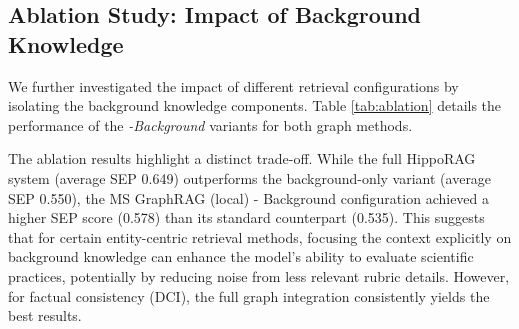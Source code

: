 \documentclass{edm_article}
\begin{document}
\subsection{Ablation Study: Impact of Background Knowledge}
We further investigated the impact of different retrieval configurations by isolating the background knowledge components. Table \ref{tab:ablation} details the performance of the \textit{-Background} variants for both graph methods.

\begin{table}[h]
\centering
\caption{Ablation Study on Background Knowledge Configuration}
\label{tab:ablation}
\end{table}

The ablation results highlight a distinct trade-off. While the full HippoRAG system (average SEP 0.649) outperforms the background-only variant (average SEP 0.550), the MS GraphRAG (local) - Background configuration achieved a higher SEP score (0.578) than its standard counterpart (0.535). This suggests that for certain entity-centric retrieval methods, focusing the context explicitly on background knowledge can enhance the model's ability to evaluate scientific practices, potentially by reducing noise from less relevant rubric details. However, for factual consistency (DCI), the full graph integration consistently yields the best results.
\end{document}
